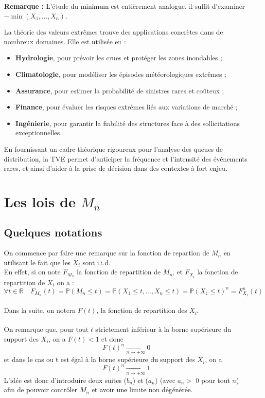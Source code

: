 \documentclass{article}
\theoremstyle{plain}
\theoremstyle{definition}
\theoremstyle{plain}
\begin{document}
\medskip
\noindent
\textbf{Remarque :} L’étude du minimum est entièrement analogue, il suffit d’examiner $-\min(X_1, \dots, X_n)$.

\medskip
\noindent
La théorie des valeurs extrêmes trouve des applications concrètes dans de nombreux domaines. Elle est utilisée en :
\begin{itemize}
    \item \textbf{Hydrologie}, pour prévoir les crues et protéger les zones inondables ;
    \item \textbf{Climatologie}, pour modéliser les épisodes météorologiques extrêmes ;
    \item \textbf{Assurance}, pour estimer la probabilité de sinistres rares et coûteux ;
    \item \textbf{Finance}, pour évaluer les risques extrêmes liés aux variations de marché ;
    \item \textbf{Ingénierie}, pour garantir la fiabilité des structures face à des sollicitations exceptionnelles.
\end{itemize}

En fournissant un cadre théorique rigoureux pour l’analyse des queues de distribution, la TVE permet d’anticiper la fréquence et l’intensité des événements rares, et ainsi d’aider à la prise de décision dans des contextes à fort enjeu.

\section{Les lois de $M_n$}

\subsection{Quelques notations }

On commence par faire une remarque sur la fonction de repartion de $M_n$ en utilisant le fait que les $X_i$ sont i.i.d.
\\
En effet, si on note $F_{M_n}$ la fonction de repartition de $M_n$, et $F_{X_i}$ la fonction de repartition de $X_i$ on a :
\[
\forall t \in \mathbb{R} \quad F_{M_n}(t) = \mathbb{P}(M_n \le t) = \mathbb{P}(X_1 \le t,...,X_n \le t)=\mathbb{P}(X_1 \le t)^n = F_{X_1}^n(t) 
\]
\\
Dans la suite, on notera $F(t)$, la fonction de repartition des $X_i$.
\\
\\
On remarque que, pour tout $t$ strictement inférieur à la borne supérieure du support des $X_i$, on a $F(t)<1$ et donc
\[
F(t)^n \xrightarrow[n\to +\infty]{} 0
\]
et dans le cas ou t est égal à la borne supérieure du support des $X_i$, on a
\[
F(t)^n \xrightarrow[n\to +\infty]{} 1
\]
L'idée est donc d'introduire deux suites ($b_n$) et ($a_n$) (avec $a_n > $  0 pour tout $n$) afin de pouvoir contrôler $M_n$ et avoir une limite non dégénérée.
\end{document}
